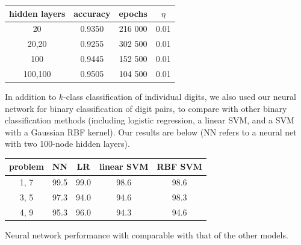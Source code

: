 \documentclass{article}
\begin{document}
\begin{multicols}{2}

\begin{center}
    \begin{tabular}{c|c|c|c}
        hidden layers & accuracy	& epochs & $\eta$ \\\hline
        20		& 0.9350 	& 216 000 	& 0.01\\
        20,20	& 0.9255 	& 302 500 	& 0.01\\
        100		& 0.9445 	& 152 500 	& 0.01 \\
        100,100	& 0.9505 	& 104 500 	& 0.01
    \end{tabular}
\end{center}








In addition to $k$-class classification of individual digits,
we also used our neural network for binary classification of digit pairs,
to compare with other binary classification methods
(including logistic regression, a linear SVM,
and a SVM with a Gaussian RBF kernel).
Our results are below
(NN refers to a neural net with two 100-node hidden layers).

\begin{center}
    \begin{tabular}{c|c|c|c|c}
        problem	& NN & LR & linear SVM & RBF SVM \\\hline
        1, 7 & 99.5 & 99.0 & 98.6 & 98.6 \\
        3, 5 & 97.3 & 94.0 & 94.6 & 98.3 \\
        4, 9 & 95.3 & 96.0 & 94.3 & 94.6 \\
    \end{tabular}
\end{center}
Neural network performance with comparable with that of the other models.



\end{multicols}
\end{document}
